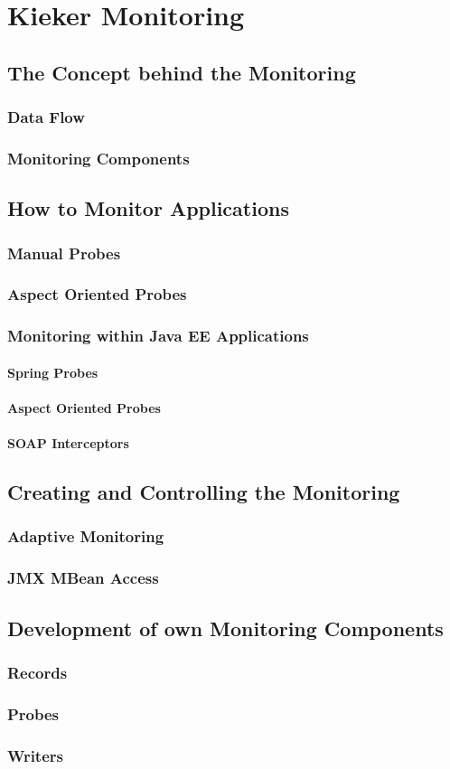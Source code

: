 \chapter{Kieker Monitoring}\label{chp:Kieker-Monitoring}
	\section{The Concept behind the Monitoring}
		\subsection{Data Flow}
		\subsection{Monitoring Components}
	\section{How to Monitor Applications}
		\subsection{Manual Probes}
		\subsection{Aspect Oriented Probes}
		\subsection{Monitoring within Java EE Applications}
			\subsubsection{Spring Probes}
			\subsubsection{Aspect Oriented Probes}
			\subsubsection{SOAP Interceptors}
	\section{Creating and Controlling the Monitoring}
		\subsection{Adaptive Monitoring}
		\subsection{JMX MBean Access}
	\section{Development of own Monitoring Components}
		\subsection{Records}
		\subsection{Probes}
		\subsection{Writers}